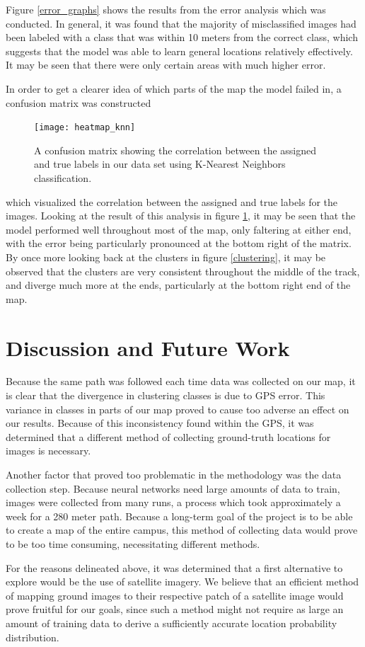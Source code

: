 \documentclass[letterpaper, 12 pt, conference]{ieeeconf}  %
\begin{document}
Figure \ref{error_graphs} shows the results from the error analysis which was conducted. In general, it was found that the majority of misclassified images had been labeled with a class that was within 10 meters from the correct class, which suggests that the model was able to learn general locations relatively effectively. It may be seen that there were only certain areas with much higher error. 
\par
In order to get a clearer idea of which parts of the map the model failed in, a confusion matrix was constructed
\begin{figure}[h]
\centering
\texttt{[image: heatmap\_knn]}
\caption{A confusion matrix showing the correlation between the assigned and true labels in our data set using K-Nearest Neighbors classification.}
\label{confusion_matrix}
\end{figure}
which visualized the correlation between the assigned and true labels for the images. Looking at the result of this analysis in figure \ref{confusion_matrix}, it may be seen that the model performed well throughout most of the map, only faltering at either end, with the error being particularly pronounced at the bottom right of the matrix. By once more looking back at the clusters in figure \ref{clustering}, it may be observed that the clusters are very consistent throughout the middle of the track, and diverge much more at the ends, particularly at the bottom right end of the map. 

\section{Discussion and Future Work}

Because the same path was followed each time data was collected on our map, it is clear that the divergence in clustering classes is due to GPS error. This variance in classes in parts of our map proved to cause too adverse an effect on our results. Because of this inconsistency found within the GPS, it was determined that a different method of collecting ground-truth locations for images is necessary. 
\par
Another factor that proved too problematic in the methodology was the data collection step. Because neural networks need large amounts of data to train, images were collected from many runs, a process which took approximately a week for a 280 meter path. Because a long-term goal of the project is to be able to create a map of the entire campus, this method of collecting data would prove to be too time consuming, necessitating different methods. 
\par
For the reasons delineated above, it was determined that a first alternative to explore would be the use of satellite imagery. We believe that an efficient method of mapping ground images to their respective patch of a satellite image would prove fruitful for our goals, since such a method might not require as large an amount of training data to derive a sufficiently accurate location probability distribution.  
\end{document}
